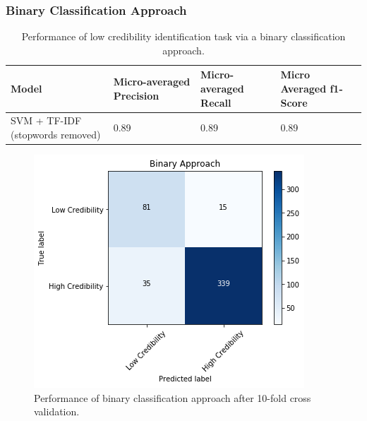 \documentclass[a4paper,twoside,phd]{BYUPhys}
\begin{document}
\subsubsection{Binary Classification Approach}
\label{sec:BinaryApproachResults}

\begin{table}[H]
	\centering
	\caption{Performance of low credibility identification task via a binary classification approach.}
	\begin{tabular}{|p{2cm}|p{3.5cm}|p{3.5cm}|p{3.5cm}|}
			\hline
			
			\textbf{Model} & \textbf{Micro-averaged Precision} & \textbf{Micro-averaged Recall} & \textbf{Micro Averaged \newline f1-Score}                                                                                                                                                                                                                                                                                                                                    \\
			\hline                                                                                                                                              
			SVM + \newline TF-IDF \newline (stopwords removed) & 0.89 & 0.89 & 0.89 \\
			\hline
			
			
			
	\end{tabular}

	\label{table:BinaryApproach}
\end{table}

\begin{figure}[H]
	\centering
	\includegraphics[totalheight=7cm]{images/binary-performance.png}
	\caption{Performance of binary classification approach after 10-fold cross validation.}
	\label{fig:BinaryPerformance}
\end{figure}
\end{document}
